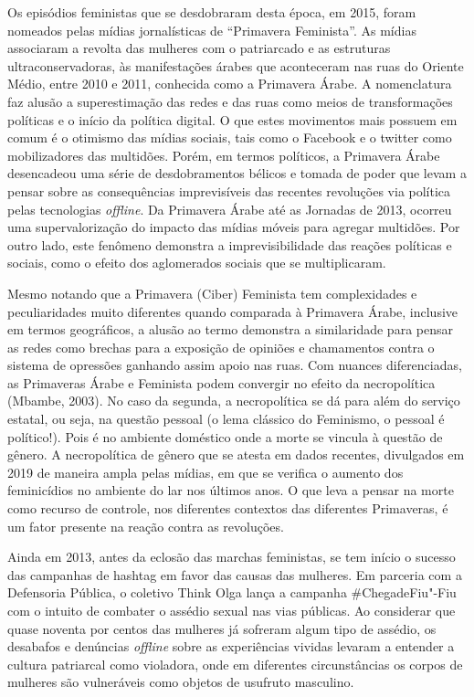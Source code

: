 Os episódios feministas que se desdobraram desta época, em 2015, foram
nomeados pelas mídias jornalísticas de ``Primavera Feminista''. As
mídias associaram a revolta das mulheres com o patriarcado e as
estruturas ultraconservadoras, às manifestações árabes que aconteceram
nas ruas do Oriente Médio, entre 2010 e 2011, conhecida como a Primavera
Árabe. A nomenclatura faz alusão a superestimação das redes e das ruas
como meios de transformações políticas e o início da política digital. O
que estes movimentos mais possuem em comum é o otimismo das mídias
sociais, tais como o Facebook e o twitter como mobilizadores das
multidões. Porém, em termos políticos, a Primavera Árabe desencadeou uma
série de desdobramentos bélicos e tomada de poder que levam a pensar
sobre as consequências imprevisíveis das recentes revoluções via
política pelas tecnologias \emph{offline}. Da Primavera Árabe até as Jornadas
de 2013, ocorreu uma supervalorização do impacto das mídias móveis para
agregar multidões. Por outro lado, este fenômeno demonstra a
imprevisibilidade das reações políticas e sociais, como o efeito dos
aglomerados sociais que se multiplicaram.

Mesmo notando que a Primavera (Ciber) Feminista tem complexidades e
peculiaridades muito diferentes quando comparada à Primavera Árabe,
inclusive em termos geográficos, a alusão ao termo demonstra a
similaridade para pensar as redes como brechas para a exposição de
opiniões e chamamentos contra o sistema de opressões ganhando assim
apoio nas ruas. Com nuances diferenciadas, as Primaveras Árabe e
Feminista podem convergir no efeito da necropolítica (Mbambe, 2003). No
caso da segunda, a necropolítica se dá para além do serviço estatal, ou
seja, na questão pessoal (o lema clássico do Feminismo, o pessoal é
político!). Pois é no ambiente doméstico onde a morte se vincula à
questão de gênero. A necropolítica de gênero que se atesta em dados
recentes, divulgados em 2019 de maneira ampla pelas mídias, em que se
verifica o aumento dos feminicídios no ambiente do lar nos últimos anos.
O que leva a pensar na morte como recurso de controle, nos diferentes
contextos das diferentes Primaveras, é um fator presente na reação
contra as revoluções.

Ainda em 2013, antes da eclosão das marchas feministas, se tem início o
sucesso das campanhas de hashtag em favor das causas das mulheres. Em
parceria com a Defensoria Pública, o coletivo Think Olga lança a
campanha \#ChegadeFiu"-Fiu com o intuito de combater o assédio sexual nas
vias públicas. Ao considerar que quase noventa por centos das mulheres
já sofreram algum tipo de assédio, os desabafos e denúncias \emph{offline}
sobre as experiências vividas levaram a entender a cultura patriarcal
como violadora, onde em diferentes circunstâncias os corpos de mulheres
são vulneráveis como objetos de usufruto masculino.

